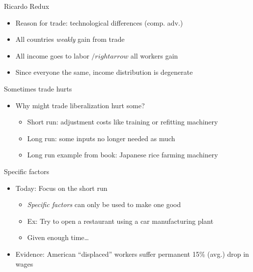 \documentclass[ignorenonframetext,]{beamer}
\begin{document}
\begin{frame}{Ricardo Redux}

    \begin{itemize}
        \item Reason for trade: technological differences (comp. adv.)
        \item All countries \emph{weakly} gain from trade
        \item All income goes to labor $/rightarrow$ all workers gain
        \item Since everyone the same, income distribution is degenerate
    \end{itemize}

\end{frame}

\begin{frame}{Sometimes trade hurts}

    \begin{itemize}
        \item Why might trade liberalization hurt some?
        \begin{itemize}
            \item Short run: adjustment costs like training or refitting machinery
            \item Long run: some inputs no longer needed as much
            \item Long run example from book: Japanese rice farming machinery 
        \end{itemize}
    \end{itemize}

\end{frame}

\begin{frame}{Specific factors}

    \begin{itemize}
        \item Today: Focus on the short run
        \begin{itemize}
            \item \emph{Specific factors} can only be used to make one good
            \item Ex: Try to open a restaurant using a car manufacturing plant
            \item Given enough time\dots
        \end{itemize}
        \item Evidence: American ``displaced'' workers suffer permanent 15\% (avg.) drop in wages 
    \end{itemize}

\end{frame}
\end{document}
